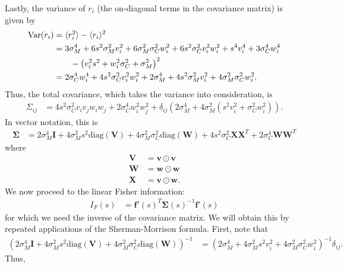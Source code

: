 \documentclass[11pt]{article}
\begin{document}
	Lastly, the variance of $r_i$ (the on-diagonal terms in the covariance matrix) is given by 
	\begin{align}
	\text{Var}(r_i) &= \langle r_i^2 \rangle - \langle r_i\rangle^2 \\
	&= 3\sigma_M^4 + 6s^2\sigma_M^2  v_i^2  +6 \sigma_M^2 \sigma_C^2  w_i^2+  6s^2 \sigma_C^2 v_i^2 w_i^2+ s^4 v_i^4 + 3\sigma_C^4 w_i^4 \notag \\ 
	& \qquad -\left(v_i^2 s^2 + w_i^2 \sigma_C^2 + \sigma_M^2\right)^2 \\
	&= 2\sigma_C^4 w_i^4 + 4s^2 \sigma_C^2 v_i^2 w_i^2 + 2\sigma_M^4 + 4s^2 \sigma_M^2 v_i^2  + 4\sigma_M^2\sigma_C^2 w_i^2.
	\end{align}
	Thus, the total covariance, which takes the variance into consideration, is 
	\begin{align}
	\Sigma_{ij} &= 4 s^2 \sigma_C^2 v_i v_j w_i w_j + 2 \sigma_C^4 w_i^2 w_j^2 + \delta_{ij} \left(2 \sigma_M^4 + 4\sigma_M^2 (s^2 v_i^2 + \sigma_C^2 w_i^2)\right).
	\end{align}
	In vector notation, this is 
	\begin{align}
	\boldsymbol{\Sigma} &= 2\sigma_M^4 \mathbf{I} +4\sigma_M^2 s^2 \text{diag}(\mathbf{V}) + 4\sigma_M^2 \sigma_C^2 \text{diag}(\mathbf{W}) + 4s^2 \sigma_C^2 \mathbf{X}\mathbf{X}^T + 2 \sigma_C^4 \mathbf{W}\mathbf{W}^T
	\end{align}
	where
	\begin{align}
		\mathbf{V} &= \mathbf{v} \odot \mathbf{v}\\
		\mathbf{W} &= \mathbf{w} \odot \mathbf{w}\\
		\mathbf{X} &= \mathbf{v} \odot \mathbf{w}.
	\end{align}
	We now proceed to the linear Fisher information:
	\begin{align}
	I_F(s) &= \mathbf{f}'(s)^T \boldsymbol{\Sigma}(s)^{-1} \mathbf{f}'(s)
	\end{align}
	for which we need the inverse of the covariance matrix. We will obtain this by repeated applications of the Sherman-Morrison formula. First, note that 
	\begin{align}
	\left(2\sigma_M^4 \mathbf{I} +4\sigma_M^2 s^2 \text{diag}(\mathbf{V}) + 4\sigma_M^2 \sigma_C^2 \text{diag}(\mathbf{W})\right)^{-1} &= \left(2\sigma_M^4 + 4\sigma_M^2 s^2 v_i^2 + 4\sigma_M^2 \sigma_C^2 w_i^2\right)^{-1}\delta_{ij}.
	\end{align}
	Thus,
\end{document}
